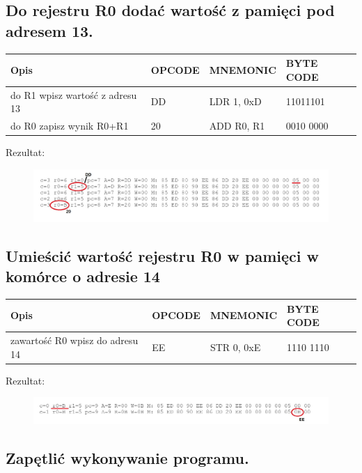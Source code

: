 \documentclass[12pt,a4paper]{article}
\begin{document}
	
	\subsection{Do rejestru R0 dodać wartość z pamięci pod adresem 13.}
	
	\begin{table}[!ht]
		\centering
		\begin{tabular}{l|l|l|l}
		Opis                               & OPCODE & MNEMONIC   & BYTE CODE \\ \hline
		do R1 wpisz wartość z adresu 13    & DD     & LDR 1, 0xD & 11011101  \\
		do R0 zapisz wynik R0+R1        & 20     & ADD R0, R1 & 0010 0000
		\end{tabular}
	\end{table}
	Rezultat:
	
	\begin{figure}[!ht]
		\centering
		\includegraphics[width=1\linewidth]{graphics/log5}
	\end{figure}
	
	\subsection{Umieścić wartość rejestru R0 w pamięci w komórce o adresie 14}
	
	\begin{table}[!ht]
		\centering
		\begin{tabular}{l|l|l|l}
		Opis                            & OPCODE & MNEMONIC   & BYTE CODE \\ \hline
		zawartość R0 wpisz do adresu 14 & EE     & STR 0, 0xE & 1110 1110
		\end{tabular}
	\end{table}
	Rezultat:
	
	\begin{figure}[!ht]
		\centering
		\includegraphics[width=1\linewidth]{graphics/log6}
	\end{figure}
	\newpage
	\subsection{Zapętlić wykonywanie programu.}
	
\end{document}
